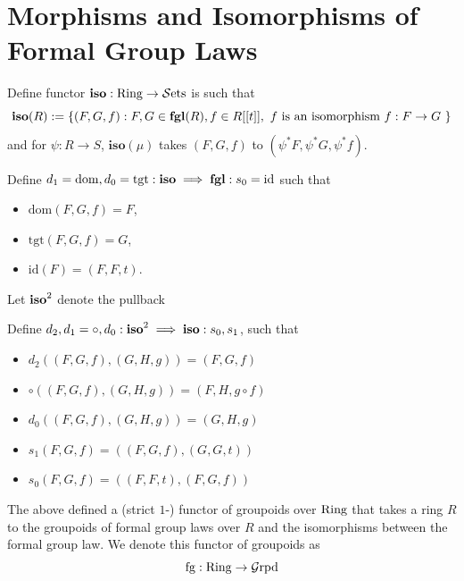 \section{Morphisms and Isomorphisms of Formal Group Laws}\label{sec:chromatichomotopy-morphismsformalgrouplaw}


\begin{definition}
        Define functor $\mathbf{iso}: \mathrm{Ring}\to \operatorname{\mathcal{S}ets}$ is such that 
    \[
    \mathbf{iso}(R):=\{(F, G, f): F, G\in \operatorname{\mathbf{fgl}}(R), f\in R[[t]], \text{ $f$ is an isomorphism $f: F\to G$ }\}
    \]and for $\psi: R\to S$, $\mathbf{iso}(\mu)$ takes $(F, G, f)$ to $(\psi^*F, \psi^*G, \psi^*f)$.

    Define $d_1=\mathrm{dom}, d_0=\mathrm{tgt}:\operatorname{\mathbf{iso}}\implies \operatorname{\mathbf{fgl}}: s_0=\mathrm{id}$ such that 
    \begin{itemize}
        \item $\mathrm{dom}(F,G,f)= F$,
        \item  $\mathrm{tgt}(F,G,f)=G$, 
        \item $\mathrm{id}(F)=(F,F,t)$.
    \end{itemize}
    
    Let $\operatorname{\mathbf{iso}}^2$ denote the pullback
    \begin{center}
    \end{center}
    Define $d_2, d_1=\circ, d_0: \operatorname{\mathbf{iso}}^2\implies \operatorname{\mathbf{iso}}: s_0, s_1$, such that
    \begin{itemize}
        \item $d_2((F, G, f), (G, H, g))=(F,G,f)$
        \item $\circ ((F,G,f),(G,H,g))=(F,H,g\circ f)$
        \item $d_0((F,G,f),(G,H,g))=(G,H, g)$
        \item $s_1(F,G,f)=((F,G,f),(G,G,t))$
        \item $s_0(F,G,f)=((F,F,t),(F,G,f))$
    \end{itemize}
\end{definition}

    The above defined a (strict $1$-) functor of groupoids over $\mathrm{Ring}$ that takes a ring $R$ to the groupoids of formal group laws over $R$ and the isomorphisms between the formal group law. We denote this functor of groupoids as 
    \[
    \mathrm{fg}: \mathrm{Ring}\to \operatorname{\mathcal{G}rpd}
    \]
   
